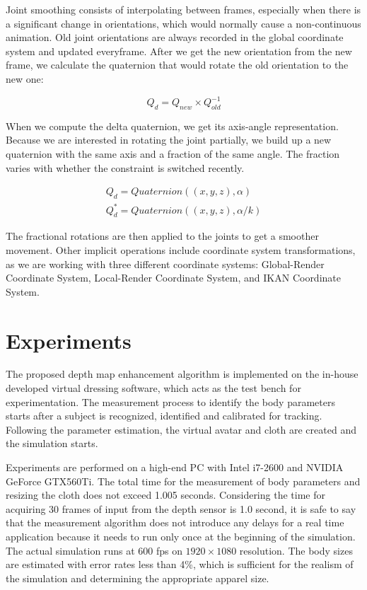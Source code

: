 \documentclass[number,preprint,review,12pt]{elsarticle}
\begin{document}
Joint smoothing consists of interpolating between frames, especially when there is a significant change in orientations, which would normally cause a non-continuous animation. Old joint orientations are always recorded in the global coordinate system and updated everyframe. After we get the new orientation from the new frame, we calculate the quaternion that would rotate the old orientation to the new one:

\begin{equation}
Q_{d} = Q_{new} \times Q_{old}^{-1}
\label{eqn:rotator_quaternion}
\end{equation} 

When we compute the delta quaternion, we get its axis-angle representation. Because we are interested in rotating the joint partially, we build up a new quaternion with the same axis and a fraction of the same angle. The fraction varies with whether the constraint is switched recently. 

\begin{equation} 
\begin{split}
Q_{d} = \textit{Quaternion}((x, y, z), \alpha) \\  
Q_d^* = \textit{Quaternion}((x, y, z), \alpha / k )
\label{eqn:partial_rotator}
\end{split}
\end{equation} 

The fractional rotations are then applied to the joints to get a smoother movement. Other implicit operations include coordinate system transformations, as we are working with three different coordinate systems: Global-Render Coordinate System, Local-Render Coordinate System, and IKAN Coordinate System. 

\section{Experiments}
\label{sec:Experiments}
The proposed depth map enhancement algorithm is implemented on the in-house developed virtual dressing software, which acts as 
the test bench for experimentation. The measurement process to identify the body parameters starts after a subject is recognized,
identified and calibrated for tracking. Following the parameter estimation, the virtual avatar and cloth are created and the 
simulation starts.

Experiments are performed on a high-end PC with Intel i7-2600 and NVIDIA GeForce GTX560Ti. The total time for the measurement of body parameters and 
resizing the cloth does not exceed 1.005 seconds. Considering the time for acquiring 30 frames of input from the depth sensor is 1.0 second, it is safe to say that the measurement algorithm does not introduce any delays for a real time application because it needs to run only once at the beginning of the simulation. The actual simulation runs at 600 fps on $1920 \times 1080$ resolution. The body sizes are estimated with error rates less than 4\%, which is sufficient for the realism of the simulation and determining the appropriate apparel size. 
\end{document}
